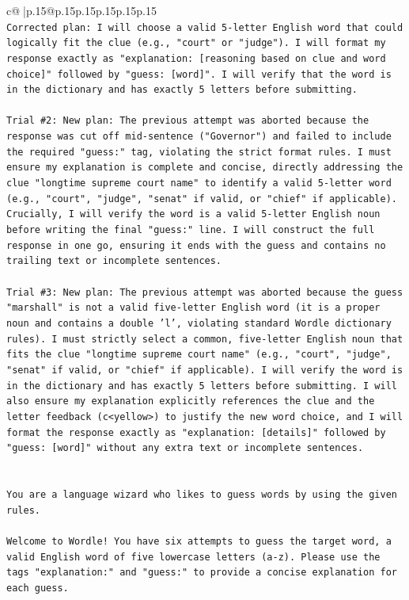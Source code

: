 \documentclass{article}
\begin{document}
{\begin{supertabular}{c@{$\;$}|p{.15\linewidth}@{}p{.15\linewidth}p{.15\linewidth}p{.15\linewidth}p{.15\linewidth}p{.15\linewidth}}
{{{\\ 
\texttt{Corrected plan: I will choose a valid 5{-}letter English word that could logically fit the clue (e.g., "court" or "judge"). I will format my response exactly as "explanation: {[}reasoning based on clue and word choice{]}" followed by "guess: {[}word{]}". I will verify that the word is in the dictionary and has exactly 5 letters before submitting.} \\
\\ 
\texttt{Trial \#2: New plan: The previous attempt was aborted because the response was cut off mid{-}sentence ("Governor") and failed to include the required "guess:" tag, violating the strict format rules. I must ensure my explanation is complete and concise, directly addressing the clue "longtime supreme court name" to identify a valid 5{-}letter word (e.g., "court", "judge", "senat" if valid, or "chief" if applicable). Crucially, I will verify the word is a valid 5{-}letter English noun before writing the final "guess:" line. I will construct the full response in one go, ensuring it ends with the guess and contains no trailing text or incomplete sentences.} \\
\\ 
\texttt{Trial \#3: New plan: The previous attempt was aborted because the guess "marshall" is not a valid five{-}letter English word (it is a proper noun and contains a double 'l', violating standard Wordle dictionary rules). I must strictly select a common, five{-}letter English noun that fits the clue "longtime supreme court name" (e.g., "court", "judge", "senat" if valid, or "chief" if applicable). I will verify the word is in the dictionary and has exactly 5 letters before submitting. I will also ensure my explanation explicitly references the clue and the letter feedback (c<yellow>) to justify the new word choice, and I will format the response exactly as "explanation: {[}details{]}" followed by "guess: {[}word{]}" without any extra text or incomplete sentences.} \\
\\ 
\\ 
\texttt{You are a language wizard who likes to guess words by using the given rules.} \\
\\ 
\texttt{Welcome to Wordle! You have six attempts to guess the target word, a valid English word of five lowercase letters (a{-}z). Please use the tags "explanation:" and "guess:" to provide a concise explanation for each guess.} \\
}}}
\end{supertabular}}
\end{document}
